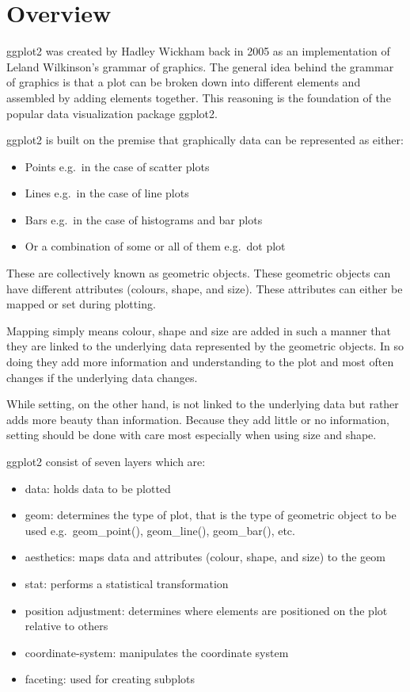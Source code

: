 \documentclass[
]{book}
\providecommand{\tightlist}{%
  \setlength{\itemsep}{0pt}\setlength{\parskip}{0pt}}
\begin{document}
\hypertarget{overview}{%
\section{Overview}\label{overview}}

ggplot2 was created by Hadley Wickham back in 2005 as an implementation of Leland Wilkinson's grammar of graphics.
The general idea behind the grammar of graphics is that a plot can be broken down into different elements and assembled by adding elements together. This reasoning is the foundation of the popular data visualization package ggplot2.

ggplot2 is built on the premise that graphically data can be represented as either:

\begin{itemize}
\tightlist
\item
  Points e.g.~in the case of scatter plots
\item
  Lines e.g.~in the case of line plots
\item
  Bars e.g.~in the case of histograms and bar plots
\item
  Or a combination of some or all of them e.g.~dot plot
\end{itemize}

These are collectively known as geometric objects. These geometric objects can have different attributes (colours, shape, and size). These attributes can either be mapped or set during plotting.

Mapping simply means colour, shape and size are added in such a manner that they are linked to the underlying data represented by the geometric objects. In so doing they add more information and understanding to the plot and most often changes if the underlying data changes.

While setting, on the other hand, is not linked to the underlying data but rather adds more beauty than information. Because they add little or no information, setting should be done with care most especially when using size and shape.

ggplot2 consist of seven layers which are:

\begin{itemize}
\tightlist
\item
  data: holds data to be plotted
\item
  geom: determines the type of plot, that is the type of geometric object to be used e.g.~geom\_point(), geom\_line(), geom\_bar(), etc.
\item
  aesthetics: maps data and attributes (colour, shape, and size) to the geom
\item
  stat: performs a statistical transformation
\item
  position adjustment: determines where elements are positioned on the plot relative to others
\item
  coordinate-system: manipulates the coordinate system
\item
  faceting: used for creating subplots
\end{itemize}
\end{document}
